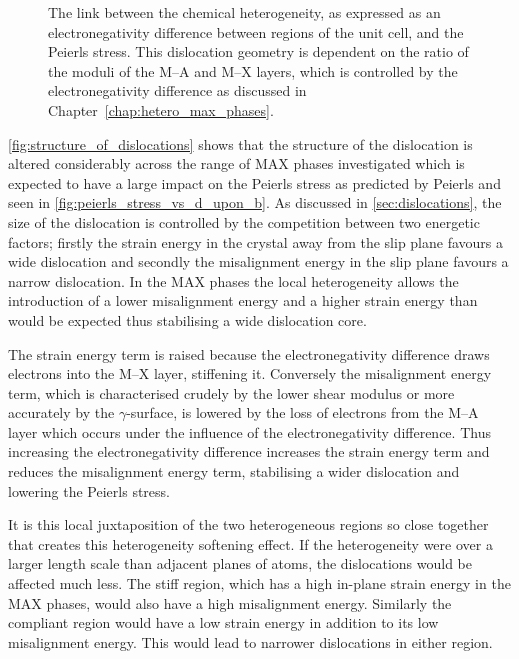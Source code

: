 \begin{figure}
\caption[The link between the structure of dislocations and local heterogeneity.]{The link between the chemical heterogeneity, as expressed as an electronegativity difference between regions of the unit cell, and the Peierls stress. This dislocation geometry is dependent on the ratio of the moduli of the M--A and M--X layers, which is controlled by the electronegativity difference as discussed in Chapter~\ref{chap:hetero_max_phases}. \label{fig:structure_of_dislocations}}
\end{figure}


\autoref{fig:structure_of_dislocations} shows that the structure of the dislocation is altered considerably across the range of MAX phases investigated which is expected to have a large impact on the Peierls stress as predicted by Peierls and seen in \autoref{fig:peierls_stress_vs_d_upon_b}. As discussed in \autoref{sec:dislocations}, the size of the dislocation is controlled by the competition between two energetic factors; firstly the strain energy in the crystal away from the slip plane favours a wide dislocation and secondly the misalignment energy in the slip plane favours a narrow dislocation. In the MAX phases the local heterogeneity allows the introduction of a lower misalignment energy and a higher strain energy than would be expected thus stabilising a wide dislocation core.

The strain energy term is raised because the electronegativity difference draws electrons into the M--X layer, stiffening it. Conversely the misalignment energy term, which is characterised crudely by the lower shear modulus or more accurately by the $\gamma$-surface, is lowered by the loss of electrons from the M--A layer which occurs under the influence of the electronegativity difference. Thus increasing the electronegativity difference increases the strain energy term and reduces the misalignment energy term, stabilising a wider dislocation and lowering the Peierls stress.

It is this local juxtaposition of the two heterogeneous regions so close together that creates this heterogeneity softening effect. If the heterogeneity were over a larger length scale than adjacent planes of atoms, the dislocations would be affected much less. The stiff region, which has a high in-plane strain energy in the MAX phases, would also have a high misalignment energy. Similarly the compliant region would have a low strain energy in addition to its low misalignment energy. This would lead to narrower dislocations in either region.





